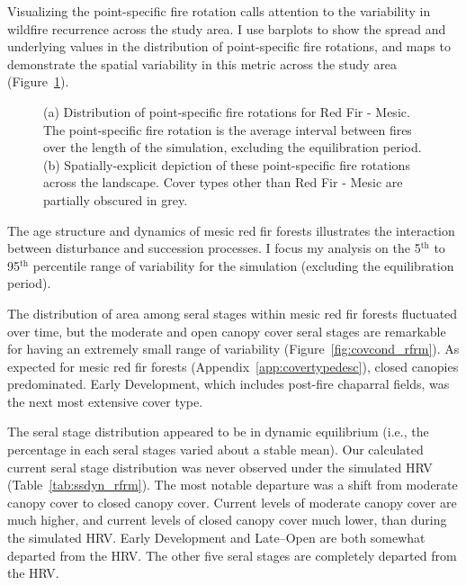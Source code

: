 Visualizing the point-specific fire rotation calls attention to the variability in wildfire recurrence across the study area. I use barplots to show the spread and underlying values in the distribution of point-specific fire rotations, and maps to demonstrate the spatial variability in this metric across the study area (Figure~\ref{fig:preturn_rfrm}). 

\begin{figure}[!htbp]
  \centering
  \caption{(a) Distribution of point-specific fire rotations for Red Fir - Mesic. The point-specific fire rotation is the average interval between fires over the length of the simulation, excluding the equilibration period. (b) Spatially-explicit depiction of these point-specific fire rotations across the landscape. Cover types other than Red Fir - Mesic are partially obscured in grey.}
\label{fig:preturn_rfrm}
\end{figure}

The age structure and dynamics of mesic red fir forests illustrates the interaction between disturbance and succession processes. I focus my analysis on the 5$^{\text{th}}$ to 95$^{\text{th}}$ percentile range of variability for the simulation (excluding the equilibration period). %

The distribution of area among seral stages within mesic red fir forests fluctuated over time, but the moderate and open canopy cover seral stages are remarkable for having an extremely small range of variability (Figure~\ref{fig:covcond_rfrm}). As expected for mesic red fir forests (Appendix~\ref{app:covertypedesc}), closed canopies predominated. Early Development, which includes post-fire chaparral fields, was the next most extensive cover type. %

The seral stage distribution appeared to be in dynamic equilibrium (i.e., the percentage in each seral stages varied about a stable mean). Our calculated current seral stage distribution was never observed under the simulated HRV (Table~\ref{tab:ssdyn_rfrm}). The most notable departure was a shift from moderate canopy cover to closed canopy cover. Current levels of moderate canopy cover are much higher, and current levels of closed canopy cover much lower, than during the simulated HRV. Early Development and Late--Open are both somewhat departed from the HRV. The other five seral stages are completely departed from the HRV. 

